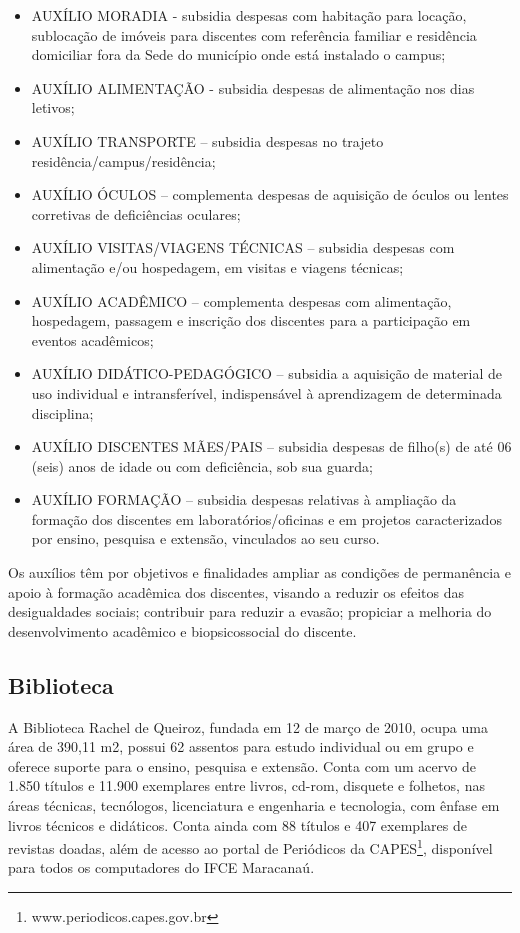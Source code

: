 \begin{itemize}
	\item AUXÍLIO MORADIA - subsidia despesas com habitação para locação, sublocação de imóveis para discentes com referência familiar e residência domiciliar fora da Sede do município onde está instalado o campus;
	\item AUXÍLIO ALIMENTAÇÃO - subsidia despesas de alimentação nos dias letivos;
	\item AUXÍLIO TRANSPORTE – subsidia despesas no trajeto residência/campus/residência;
	\item AUXÍLIO ÓCULOS – complementa despesas de aquisição de óculos ou lentes corretivas de deficiências oculares;
	\item AUXÍLIO VISITAS/VIAGENS TÉCNICAS – subsidia despesas com alimentação e/ou hospedagem, em visitas e viagens técnicas;
	\item AUXÍLIO ACADÊMICO – complementa despesas com alimentação, hospedagem, passagem e inscrição dos discentes para a participação em eventos acadêmicos;
	\item AUXÍLIO DIDÁTICO-PEDAGÓGICO – subsidia a aquisição de material de uso individual e intransferível, indispensável à aprendizagem de determinada disciplina;
	\item AUXÍLIO DISCENTES MÃES/PAIS – subsidia despesas de filho(s) de até 06 (seis) anos de idade ou com deficiência, sob sua guarda;
	\item AUXÍLIO FORMAÇÃO – subsidia despesas relativas à ampliação da formação dos discentes em laboratórios/oficinas e em projetos caracterizados por ensino, pesquisa e extensão, vinculados ao seu curso.
\end{itemize}

Os auxílios têm por objetivos e finalidades ampliar as condições de permanência e apoio à formação acadêmica dos discentes, visando a reduzir os efeitos das desigualdades sociais; contribuir para reduzir a evasão; propiciar a melhoria do desenvolvimento acadêmico e biopsicossocial do discente.

\subsection{Biblioteca}

A Biblioteca Rachel de Queiroz, fundada em 12 de março de 2010, ocupa uma área de 390,11 m2, possui 62 assentos para estudo individual ou em grupo e oferece suporte para o ensino, pesquisa e extensão. Conta com um acervo de 1.850 títulos e 11.900 exemplares entre livros, cd-rom, disquete e folhetos, nas áreas técnicas, tecnólogos, licenciatura e engenharia e tecnologia, com ênfase em livros técnicos e didáticos. Conta ainda com 88 títulos e 407 exemplares de revistas doadas, além de acesso ao portal de Periódicos da CAPES\footnote{www.periodicos.capes.gov.br}, disponível para todos os computadores do IFCE Maracanaú.

